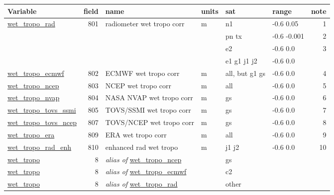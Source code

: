 \documentclass[a4paper,11pt,openany,natbib]{thesis}
\makeatletter
\newcommand\var[1]{\url{#1}\index{variables!#1@\protect\url{#1}}}
\newcommand\alias[1]{\emph{alias of} \var{#1}}
\newenvironment{vartable}{
\begin{table}[ht]
\small
\begin{tabular}{lrllllr}
\hline
Variable & field & name & units & sat & range & note \\
\hline
}{
\hline
\end{tabular}
\end{table}
}
\makeatother
\begin{document}
\begin{vartable}
\var{wet_tropo_rad} & 801 & radiometer wet tropo corr & m & n1 & -0.6 0.05 & 1 \\
                    &     &                           &   & pn tx & -0.6 -0.001 & 2 \\
                    &     &                           &   & e2 & -0.6 0.0 & 3 \\
                    &     &                           &   & e1 g1 j1 j2 & -0.6 0.0 & \\
\var{wet_tropo_ecmwf} & 802 & ECMWF wet tropo corr    & m & all, but g1 gs & -0.6 0.0 & 4 \\ 
\var{wet_tropo_ncep} & 803 & NCEP wet tropo corr      & m & all & -0.6 0.0 & 5 \\
\var{wet_tropo_nvap} & 804 & NASA NVAP wet tropo corr & m & gs & -0.6 0.0 & 6 \\
\var{wet_tropo_tovs_ssmi} & 805 & TOVS/SSMI wet tropo corr & m & gs & -0.6 0.0 & 7 \\
\var{wet_tropo_tovs_ncep} & 807 & TOVS/NCEP wet tropo corr & m & gs & -0.6 0.0 & 8 \\
\var{wet_tropo_era} & 809 & ERA wet tropo corr        & m & all & -0.6 0.0 & 9 \\
\var{wet_tropo_rad_enh} & 810 & enhanced rad wet tropo & m & j1 j2 & -0.6 0.0 & 10 \\
\hline
\var{wet_tropo} & 8 & \alias{wet_tropo_ncep} & & gs & & \\
\var{wet_tropo} & 8 & \alias{wet_tropo_ecmwf} & & c2 & & \\
\var{wet_tropo} & 8 & \alias{wet_tropo_rad} & & other & & \\
\end{vartable}
\end{document}
